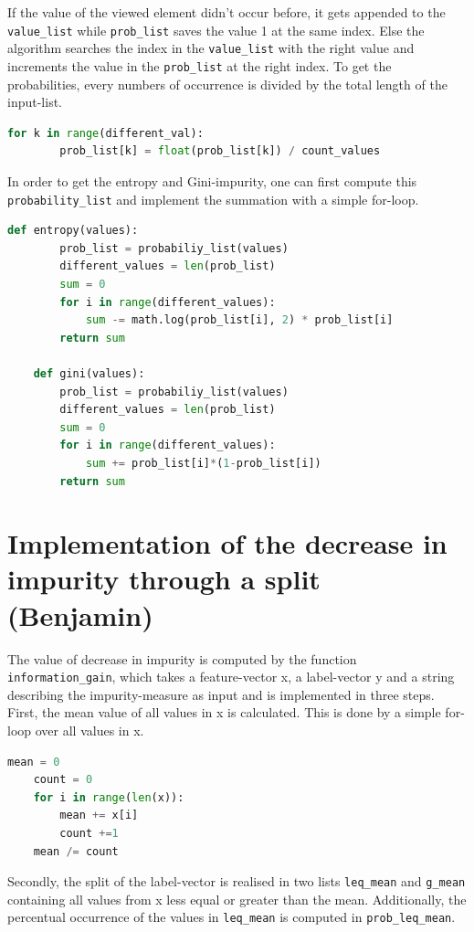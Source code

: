 \documentclass[12pt,a4paper]{scrartcl}		%
\begin{document}
If the value of the viewed element didn’t occur before, it gets appended to the \texttt{value\_list} while \texttt{prob\_list} 
saves the value 1 at the same index. Else the algorithm searches the index in the \texttt{value\_list} with the right 
value and increments the value in the \texttt{prob\_list} at the right index. 
To get the probabilities, every numbers of occurrence is divided by the total length of the input-list.

\begin{lstlisting}[language=Python]
    for k in range(different_val):
        prob_list[k] = float(prob_list[k]) / count_values
\end{lstlisting}

In order to get the entropy and Gini-impurity, one can first compute this \texttt{probability\_list} and implement 
the summation with a simple for-loop.

\begin{lstlisting}[language=Python]
    def entropy(values):
        prob_list = probabiliy_list(values)
        different_values = len(prob_list)
        sum = 0
        for i in range(different_values):
            sum -= math.log(prob_list[i], 2) * prob_list[i]
        return sum

    def gini(values):
        prob_list = probabiliy_list(values)
        different_values = len(prob_list)
        sum = 0
        for i in range(different_values):
            sum += prob_list[i]*(1-prob_list[i])
        return sum
\end{lstlisting}

\section{Implementation of the decrease in impurity through a split (Benjamin) }
The value of decrease in impurity is computed by the function \texttt{information\_gain}, which takes a feature-vector x, 
a label-vector y and a string describing the impurity-measure as input and is implemented in three steps. 
First, the mean value of all values in x is calculated. This is done by a simple for-loop over all values in x.

\begin{lstlisting}[language=Python]
    mean = 0
    count = 0
    for i in range(len(x)):
        mean += x[i]
        count +=1
    mean /= count
\end{lstlisting}

Secondly, the split of the label-vector is realised in two lists \texttt{leq\_mean} and \texttt{g\_mean} containing all 
values from x less equal or greater than the mean. Additionally, the percentual occurrence of the values 
in \texttt{leq\_mean} is computed in \texttt{prob\_leq\_mean}.
\end{document}

